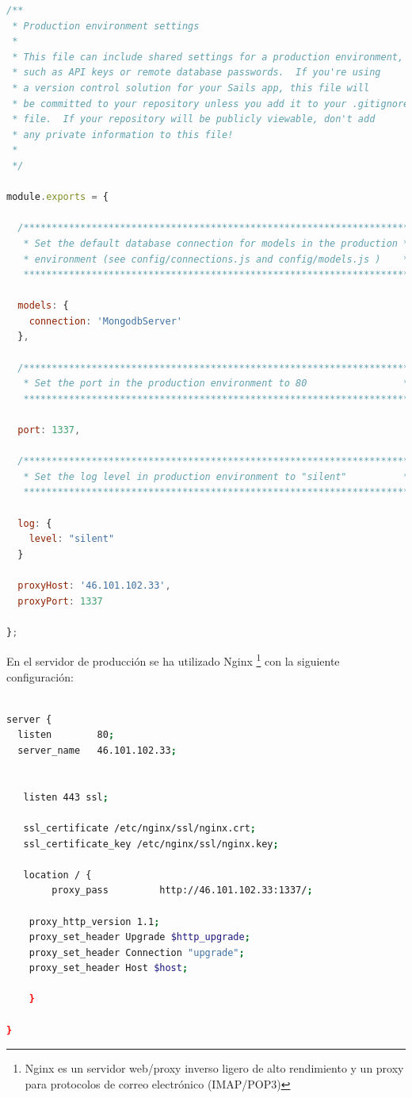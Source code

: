 \begin{lstlisting}[language=JavaScript]
/**
 * Production environment settings
 *
 * This file can include shared settings for a production environment,
 * such as API keys or remote database passwords.  If you're using
 * a version control solution for your Sails app, this file will
 * be committed to your repository unless you add it to your .gitignore
 * file.  If your repository will be publicly viewable, don't add
 * any private information to this file!
 *
 */

module.exports = {

  /********************************************************************
   * Set the default database connection for models in the production *
   * environment (see config/connections.js and config/models.js )    *
   ********************************************************************/

  models: {
    connection: 'MongodbServer'
  },

  /********************************************************************
   * Set the port in the production environment to 80                 *
   ********************************************************************/

  port: 1337,

  /********************************************************************
   * Set the log level in production environment to "silent"          *
   ********************************************************************/

  log: {
    level: "silent"
  }

  proxyHost: '46.101.102.33',
  proxyPort: 1337

};
\end{lstlisting}

En el servidor de producción se ha utilizado Nginx \footnote{Nginx es un servidor web/proxy inverso ligero de alto rendimiento y un proxy para protocolos de correo electrónico (IMAP/POP3)} 
con la siguiente configuración:\\

\begin{lstlisting}[language=bash]

server {
  listen        80;
  server_name   46.101.102.33;


   listen 443 ssl;

   ssl_certificate /etc/nginx/ssl/nginx.crt;
   ssl_certificate_key /etc/nginx/ssl/nginx.key;

   location / {
        proxy_pass         http://46.101.102.33:1337/;

	proxy_http_version 1.1;
	proxy_set_header Upgrade $http_upgrade;
	proxy_set_header Connection "upgrade";
	proxy_set_header Host $host;

    }

}

\end{lstlisting}

